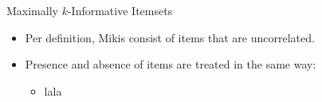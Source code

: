 \documentclass[12pt]{beamer}
\theoremstyle{break}
\begin{document}
\begin{frame}{Maximally $k$-Informative Itemsets}

	\begin{itemize}
		\item Per definition, Mikis consist of items that are uncorrelated.
		\item Presence and absence of items are treated in the same way:\begin{itemize}
			\item lala
		\end{itemize}
	\end{itemize}

	
\end{frame}





















\end{document}
